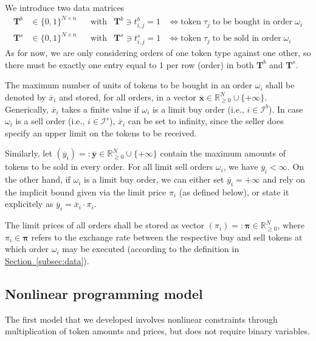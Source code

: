 \documentclass[11pt,parskip=full]{scrartcl}%
\newcommand*{\ie}{i.e., }
\newcommand*{\ibuyorders}{\mathcal{I}^b}    %
\newcommand*{\isellorders}{\mathcal{I}^s}   %
\newcommand*{\subsecref}[1]{\hyperref[{#1}]{Section~\ref*{#1}}}
\begin{document}
We introduce two data matrices
\begin{align*}
  \mathbf{T}^b &\in \{0,1\}^{N \times n} && \text{with} & \mathbf{T}^b \ni t^b_{i,j} = 1
  &\Leftrightarrow
  \text{token} \; \tau_j \; \text{to be bought in order} \; \omega_i \\
  \mathbf{T}^s &\in \{0,1\}^{N \times n} && \text{with} & \mathbf{T}^s \ni t^s_{i,j} = 1
  &\Leftrightarrow
  \text{token} \; \tau_j \; \text{to be sold in order} \; \omega_i
\end{align*}
As for now, we are only considering orders of one token type against one other, so there must be
exactly one entry equal to $ 1 $ per row (order) in both $ \mathbf{T}^b $ and $ \mathbf{T}^s $.

The maximum number of units of tokens to be bought in an order $ \omega_i $ shall be denoted by
$ \overline{x}_i $ and stored, for all orders, in a vector
$ \overline{\mathbf{x}} \in \mathbb{R}^N_{\ge 0} \cup \{+\infty\} $.
Generically, $ \overline{x}_i $ takes a finite value if $ \omega_i $ is a limit buy order
(\ie $ i \in \ibuyorders $).
In case $ \omega_i $ is a sell order (\ie $ i \in \isellorders $), $ \overline{x}_i $ can be set to
infinity, since the seller does specify an upper limit on the tokens to be received.

Similarly, let
$ (\overline{y}_i) =: \overline{\mathbf{y}} \in \mathbb{R}^N_{\ge 0} \cup \{+\infty\} $ contain the
maximum amounts of tokens to be sold in every order.
For all limit sell orders $ \omega_i $, we have $ \overline{y}_i < \infty $.
On the other hand, if $ \omega_i $ is a limit buy order, we can either set
$ \overline{y}_i = +\infty $ and rely on the implicit bound given via the limit price $ \pi_i $ (as
defined below), or state it explicitely as $ \overline{y}_i = \overline{x}_i \cdot \pi_i $.

The limit prices of all orders shall be stored as vector $ (\pi_i) =: \bm{\pi} \in \mathbb{R}^N_
{\ge 0} $, where $ \pi_i \in \bm{\pi} $ refers to the exchange rate between the respective buy and
sell tokens at which order $ \omega_i $ may be executed (according to the definition in
\subsecref{subsec:data}).


\subsection{Nonlinear programming model}
\label{subsec:NLPmodel}

The first model that we developed involves nonlinear constraints through multiplication of token
amounts and prices, but does not require binary variables.
\end{document}
